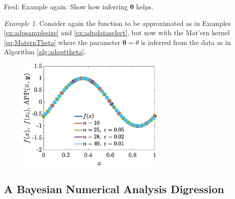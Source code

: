 \documentclass[]{mcom-l}
\theoremstyle{theorem}
\theoremstyle{remark}
\newtheorem{example}{Example}
\newcommand{\btheta}{{\boldsymbol{\theta}}}
\newcommand{\FredNote}[1]{{\color{blue}Fred: #1}}
\begin{document}
\FredNote{Example again. Show how inferring $\btheta$ helps.}

\begin{example}
	\label{ex:adpdatachooseth}
	Consider again the function to be approximated as in Examples \ref{ex:adpsamplesize} and \ref{ex:adpdataselect}, but now with the Mat'ern kernel \eqref{eq:MaternTheta} where the parameter $\btheta = \theta$ is inferred from the data as in Algorithm \ref{alg:adapttheta}.
		
	
	
	
	\begin{figure}[H]
		\centering
		\includegraphics[height = 5.5cm]{ProgramsImages/Alg3_CurrinSineFun_Matern_adapt_th_EmpBayesAx_theta_1.eps}
		\caption{ \label{fig:ex3}}
	\end{figure}
	
\end{example}




\subsection{A Bayesian Numerical Analysis Digression} \label{sec:Bayes}
\end{document}
